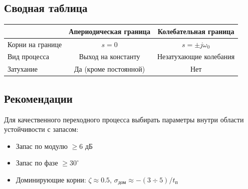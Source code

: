 \documentclass[14pt]{extreport}
\begin{document}
{\subsection*{Сводная таблица}
\begin{table}[h]
\centering
\begin{tabular}{|l|c|c|}
\hline
& \textbf{Апериодическая граница} & \textbf{Колебательная граница} \\
\hline
Корни на границе & $s = 0$ & $s = \pm j\omega_0$ \\
Вид процесса & Выход на константу & Незатухающие колебания \\
Затухание & Да (кроме постоянной) & Нет \\
\hline
\end{tabular}
\end{table}

\subsection*{Рекомендации}
Для качественного переходного процесса выбирать параметры внутри области устойчивости с запасом:
\begin{itemize}
    \item Запас по модулю $\geq 6$ дБ
    \item Запас по фазе $\geq 30^\circ$
    \item Доминирующие корни: $\zeta \approx 0.5$, $\sigma_{\text{дом}} \approx - (3 \div 5)/t_{\text{п}}$
\end{itemize}

\begin{figure}[H]
\centering
{}
\end{figure}}
\end{document}
